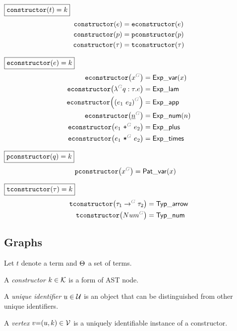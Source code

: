 \noindent $\boxed{\operatorname{\texttt{constructor}}\mathopen{}\left(t\right)\mathclose{} = k}$
%
\begin{align*}
  \operatorname{\texttt{constructor}}\mathopen{}\left(e\right)\mathclose{} &= \operatorname{\texttt{econstructor}}\mathopen{}\left(e\right)\mathclose{} \\
  \operatorname{\texttt{constructor}}\mathopen{}\left(p\right)\mathclose{} &= \operatorname{\texttt{pconstructor}}\mathopen{}\left(p\right)\mathclose{} \\
  \operatorname{\texttt{constructor}}\mathopen{}\left(\tau\right)\mathclose{} &= \operatorname{\texttt{tconstructor}}\mathopen{}\left(\tau\right)\mathclose{}
\end{align*}

\noindent $\boxed{\operatorname{\texttt{econstructor}}\mathopen{}\left(e\right)\mathclose{} = k}$
%
\begin{align*}
  \econstructor{\eVar{G}{x}} &= \ExpVar(x) \\
  \econstructor{\eFun{G}{q}{\tau}{e}} &= \ExpLam \\
  \econstructor{\eApp{G}{e_1}{e_2}} &= \ExpApp \\
  \econstructor{\eNum{G}{n}} &= \ExpNum(n) \\
  \econstructor{\ePlus{G}{e_1}{e_2}} &= \ExpPlus \\
  \econstructor{\eTimes{G}{e_1}{e_2}} &= \ExpTimes
\end{align*}

\noindent $\boxed{\operatorname{\texttt{pconstructor}}\mathopen{}\left(q\right)\mathclose{} = k}$
%
\begin{align*}
  \pconstructor{\pVar{G}{x}} &= \PatVar(x)
\end{align*}

\noindent $\boxed{\operatorname{\texttt{tconstructor}}\mathopen{}\left(\tau\right)\mathclose{} = k}$
%
\begin{align*}
  \tconstructor{\tArrow{G}{\tau_1}{\tau_2}} &= \TypArrow \\
  \tconstructor{\tNum{G}} &= \TypNum
\end{align*}


\subsection{Graphs}

Let $t$ denote a term and $\Theta_{}$ a set of terms.

\begin{definition}
  A \emph{constructor} $k \in \mathcal{K}$ is a form of AST node.
\end{definition}

\begin{definition}
  A \emph{unique identifier} $u \in \mathcal{U}$ is an object that can be distinguished from other unique identifiers.
\end{definition}

\begin{definition}
  A \emph{vertex} $v{=}(u, k) \in \mathcal{V}$ is a uniquely identifiable instance of a constructor.
\end{definition}


